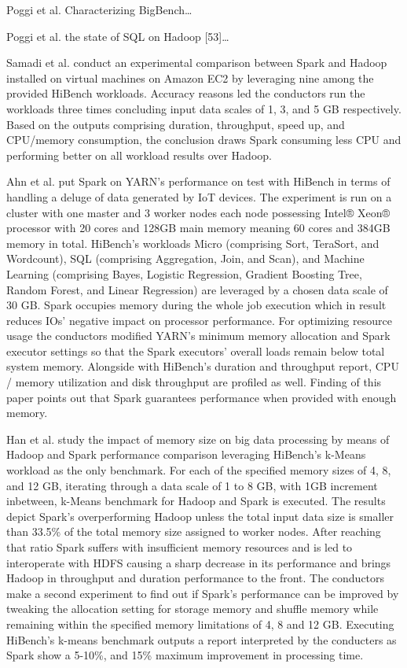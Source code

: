 \documentclass[review]{elsarticle}
\begin{document}
Poggi et al. \cite{poggi_characterizing_2018} Characterizing BigBench…

Poggi et al. \cite{poggi_state_2016} the state of SQL on Hadoop [53]…

Samadi et al. \cite{samadi_performance_2018} conduct an experimental comparison between Spark and Hadoop installed on virtual machines on Amazon EC2 by leveraging nine among the provided HiBench workloads. Accuracy reasons led the conductors run the workloads three times concluding input data scales of 1, 3, and 5 GB respectively. Based on the outputs comprising duration, throughput, speed up, and CPU/memory consumption, the conclusion draws Spark consuming less CPU and performing better on all workload results over Hadoop. 

Ahn et al. \cite{ahn_performance_2018} put Spark on YARN’s performance on test with HiBench in terms of handling a deluge of data generated by IoT devices. The experiment is run on a cluster with one master and 3 worker nodes each node possessing Intel® Xeon® processor with 20 cores and 128GB main memory meaning 60 cores and 384GB memory in total. HiBench’s workloads Micro (comprising Sort, TeraSort, and Wordcount), SQL (comprising Aggregation, Join, and Scan), and Machine Learning (comprising Bayes, Logistic Regression, Gradient Boosting Tree, Random Forest, and Linear Regression) are leveraged by a chosen data scale of 30 GB. Spark occupies memory during the whole job execution which in result reduces IOs’ negative impact on processor performance. For optimizing resource usage the conductors modified YARN’s minimum memory allocation and Spark executor settings so that the Spark executors’ overall loads remain below total system memory. Alongside with HiBench’s duration and throughput report, CPU / memory utilization and disk throughput are profiled as well. Finding of this paper points out that Spark guarantees performance when provided with enough memory.

Han et al. \cite{han_impact_2017} study the impact of memory size on big data processing by means of Hadoop and Spark performance comparison leveraging HiBench’s k-Means workload as the only benchmark. For each of the specified memory sizes of 4, 8, and 12 GB, iterating through a data scale of 1 to 8 GB, with 1GB increment inbetween, k-Means benchmark for Hadoop and Spark is executed. The results depict Spark’s overperforming Hadoop unless the total input data size is smaller than 33.5\% of the total memory size assigned to worker nodes. After reaching that ratio Spark suffers with insufficient memory resources and is led to interoperate with HDFS causing a sharp decrease in its performance and brings Hadoop in throughput and duration performance to the front. The conductors make a second experiment to find out if Spark’s performance can be improved by tweaking the allocation setting for storage memory and shuffle memory while remaining within the specified memory limitations of 4, 8 and 12 GB. Executing HiBench’s k-means benchmark outputs a report interpreted by the conducters as Spark show a 5-10\%, and 15\% maximum improvement in processing time.
\end{document}
